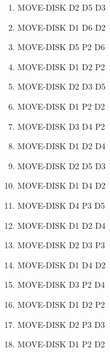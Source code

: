 \documentclass[12pt]{article}
\begin{document}
\begin{appendix}
\begin{itemize}
\begin{enumerate}
	\item  MOVE-DISK D2 D5 D3
	\item  MOVE-DISK D1 D6 D2
	\item  MOVE-DISK D5 P2 D6
	\item  MOVE-DISK D1 D2 P2
	\item  MOVE-DISK D2 D3 D5
	\item  MOVE-DISK D1 P2 D2
	\item  MOVE-DISK D3 D4 P2
	\item  MOVE-DISK D1 D2 D4
	\item  MOVE-DISK D2 D5 D3
	\item  MOVE-DISK D1 D4 D2
	\item  MOVE-DISK D4 P3 D5
	\item  MOVE-DISK D1 D2 D4
	\item  MOVE-DISK D2 D3 P3
	\item  MOVE-DISK D1 D4 D2
	\item  MOVE-DISK D3 P2 D4
	\item  MOVE-DISK D1 D2 P2
	\item  MOVE-DISK D2 P3 D3
	\item  MOVE-DISK D1 P2 D2
      \end{enumerate}
   
  \end{itemize}

\end{appendix}

\newpage
\end{document}
